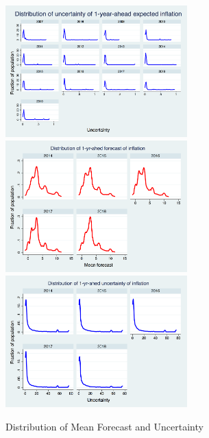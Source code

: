 \documentclass[]{article}
\begin{document}
\begin{figure}[ht]
		\includegraphics[width=7cm]{figures/PRCPCEVar1_hist.png}  \\
		\smallskip
		\includegraphics[width=7cm]{figures/SCEmean_hist.png} 
		\includegraphics[width=7cm]{figures/SCEvar_hist.png}  \\
		\caption{Distribution of Mean Forecast and Uncertainty }
		\label{Unceratitny_Histogram}
	\end{figure}
	
\end{document}
